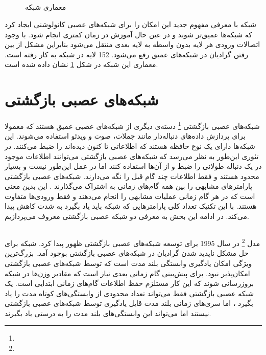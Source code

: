 \subsection{}
	\begin{figure}
		\caption[معماری شبکه ]{معماری شبکه 
			\href{https://towardsdatascience.com/illustrated-10-cnn-architectures-95d78ace614d\#e4b1}{}}
		\label{fig:ResNet}
	\end{figure}
	شبکه
	با معرفی مفهوم جدید
	\lr{skip connection]}
	این امکان را برای شبکه‌های عصبی کانولوشنی ایجاد کرد که شبکه‌ها عمیق‌تر شوند و در عین حال آموزش در زمان کمتری انجام شود. با وجود اتصالات 
	ورودی هر لایه بدون واسطه به لایه بعدی منتقل می‌شود بنابراین مشکل از بین رفتن گرادیان در شبکه‌های عمیق رفع می‌شود. 152 لایه در شبکه 
	به کار رفته است. معماری این شبکه در شکل 
	\ref{fig:ResNet}
	نشان داده شده است.

\section{شبکه‌های عصبی بازگشتی}
	شبکه‌های عصبی بازگشتی
	\footnote{}
	دسته‌ی دیگری از شبکه‌های عصبی عمیق هستند که معمولا برای پردازش داده‌های دنباله‌دار مانند جملات، صوت و ویدئو استفاده می‌شوند. این شبکه‌ها دارای یک نوع حافظه هستند که اطلاعاتی تا کنون دیده‌اند را ضبط می‌کنند. در تئوری این‌طور به نظر می‌رسد که شبکه‌های عصبی بازگشتی می‌توانند اطلاعات موجود در یک دنباله طولانی را ضبط و از آن‌ها استفاده کنند اما در عمل این‌طور نیست و بسیار محدود هستند ‌و فقط اطلاعات چند گام قبل را نگه می‌دارند. شبکه‌های عصبی بازگشتی پارامترهای مشابهی را بین همه گام‌های زمانی به اشتراک می‌گذارند . این بدین معنی است که در هر گام زمانی عملیات مشابهی را انجام می‌دهند و فقط ورودی‌ها متفاوت هستند. با این تکنیک تعداد کلی پارامتر‌هایی که شبکه باید یاد بگیرد به شدت کاهش پیدا می‌کند. در ادامه این بخش به معرفی دو شبکه عصبی بازگشتی معروف می‌پردازیم.
	
\subsection{}
	مدل 
	 \footnote{}
	در سال 1995 برای توسعه شبکه‌های عصبی بازگشتی ظهور پیدا کرد. شبکه 
	برای حل مشکل  ناپدید شدن گرادیان در شبکه‌های عصبی بازگشتی بوجود آمد. بزرگ‌ترین ویژگی 
	 امکان یادگیری وابستگی بلند مدت است که توسط شبکه‌های عصبی بازگشتی امکان‌پذیر نبود. برای پیش‌بینی گام زمانی بعدی نیاز است که مقادیر وزن‌ها در شبکه بروزرسانی شوند که این کار مستلزم حفظ اطلاعات گام‌های زمانی ابتدایی است. یک شبکه عصبی بازگشتی فقط می‌تواند تعداد محدودی از وابستگی‌های کوتاه مدت را یاد بگیرد ، اما سری‌های زمانی بلند مدت قایل یادگیری توسط شبکه‌های عصبی بازگشتی نیستند اما 
	 می‌تواند این وابستگی‌های بلند مدت را به درستی یاد بگیرند.
	 
